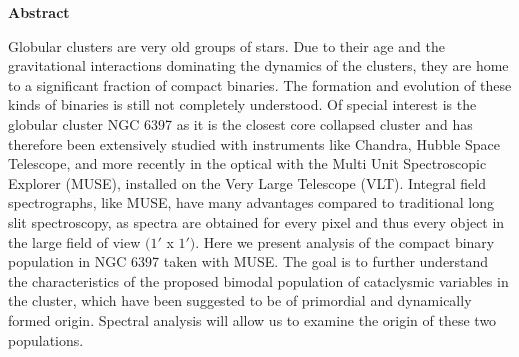 \thispagestyle{empty}
\begin{Large}
\textbf{Abstract}
\end{Large}
\bigbreak
Globular clusters are very old groups of stars. Due to their age and the gravitational interactions dominating the dynamics of the clusters, they are home to a significant fraction of compact binaries. The formation
and evolution of these kinds of binaries is still not completely understood. Of special interest is the globular cluster NGC 6397 as it is the closest core collapsed cluster and has therefore been extensively studied
with instruments like Chandra, Hubble Space Telescope, and more recently in the optical with the Multi Unit Spectroscopic Explorer (MUSE), installed on the Very Large Telescope (VLT). Integral field spectrographs, like MUSE, have many advantages compared to traditional long slit spectroscopy, as spectra are obtained for every pixel and thus every object in the large field of view $(1'$ x $1')$. Here we present analysis of the compact binary population in NGC 6397 taken with MUSE. The goal is to further understand the characteristics of the proposed bimodal population of cataclysmic variables in the cluster, which have been suggested to be of primordial and dynamically formed origin. Spectral analysis will allow us to examine the origin of these two populations.

\clearpage
